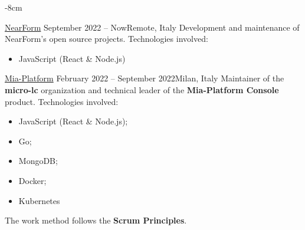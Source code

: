 \documentclass[10pt,a4paper]{altacv}
\begin{document}


\begin{adjustwidth}{}{-8cm}
\makecvheader
\end{adjustwidth}


{\href{https://www.nearform.com/}{NearForm}}
{September 2022 -- Now}{Remote, Italy}
Development and maintenance of NearForm's open source projects.
\newline\newline
Technologies involved:
\begin{itemize}
	\item JavaScript (React \& Node.js)
\end{itemize}

\divider

{\href{https://mia-platform.eu/}{Mia-Platform}}
{February 2022 -- September 2022}{Milan, Italy}
Maintainer of the \textbf{micro-lc} organization and technical leader of the \textbf{Mia-Platform Console} product.
\newline\newline
Technologies involved:
\begin{itemize}
	\item JavaScript (React \& Node.js);
	\item Go;
	\item MongoDB;
	\item Docker;
	\item Kubernetes
\end{itemize}

The work method follows the \textbf{Scrum Principles}.
\divider
\end{document}
